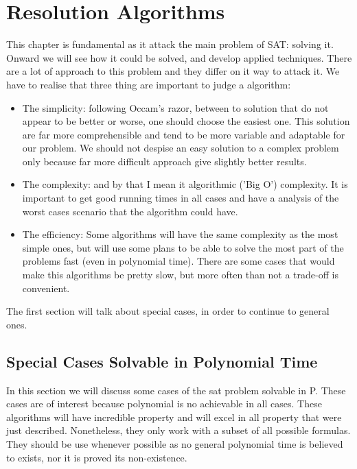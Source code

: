 
\chapter{Resolution Algorithms}

This chapter is fundamental as it attack the main problem of SAT: solving it. Onward we will see how it could be solved, and develop applied techniques. There are a lot of approach to this problem and they differ on it way to attack it. We have to realise that three thing are important to judge a algorithm:

\begin{itemize}
\item The simplicity: following Occam's razor, between to solution that do not appear to be better or worse, one should choose the easiest one. This solution are far more comprehensible and tend to be more variable and adaptable for our problem. We should not despise an easy solution to a complex problem only because far more difficult approach give slightly better results.

\item The complexity: and by that I mean it algorithmic ('Big O') complexity. It is important to get good running times in all cases and have a analysis of the worst cases scenario that the algorithm could have.

\item The efficiency: Some algorithms will have the same complexity as the most simple ones, but will use some plans to be able to solve the most part of the problems fast (even in polynomial time). There are some cases that would make this algorithms be pretty slow, but more often than not a trade-off is convenient.
\end{itemize}
  
  The first section will talk about special cases, in order to continue to general ones. 



\section{Special Cases Solvable in Polynomial Time}

In this section we will discuss some cases of the sat problem solvable in P. These cases are of interest because polynomial is no achievable in all cases. These algorithms will have incredible property and will excel in all property that were just described. Nonetheless, they only work with a subset of all possible formulas. They should be use whenever possible as no general polynomial time is believed to exists, nor it is proved its non-existence.

